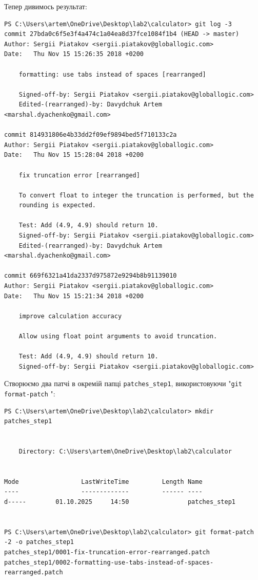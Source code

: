 \documentclass[a4paper,12pt]{article}
\begin{document}
    Тепер дивимось результат:
    \begin{verbatim}
PS C:\Users\artem\OneDrive\Desktop\lab2\calculator> git log -3
commit 27bda0c6f5e3f4a474c1a04ea8d37fce1084f1b4 (HEAD -> master)
Author: Sergii Piatakov <sergii.piatakov@globallogic.com>
Date:   Thu Nov 15 15:26:35 2018 +0200

    formatting: use tabs instead of spaces [rearranged]

    Signed-off-by: Sergii Piatakov <sergii.piatakov@globallogic.com>
    Edited-(rearranged)-by: Davydchuk Artem <marshal.dyachenko@gmail.com>

commit 814931806e4b33dd2f09ef9894bed5f710133c2a
Author: Sergii Piatakov <sergii.piatakov@globallogic.com>
Date:   Thu Nov 15 15:28:04 2018 +0200

    fix truncation error [rearranged]

    To convert float to integer the truncation is performed, but the
    rounding is expected.

    Test: Add (4.9, 4.9) should return 10.
    Signed-off-by: Sergii Piatakov <sergii.piatakov@globallogic.com>
    Edited-(rearranged)-by: Davydchuk Artem <marshal.dyachenko@gmail.com>

commit 669f6321a41da2337d975872e9294b8b91139010
Author: Sergii Piatakov <sergii.piatakov@globallogic.com>
Date:   Thu Nov 15 15:21:34 2018 +0200

    improve calculation accuracy

    Allow using float point arguments to avoid truncation.

    Test: Add (4.9, 4.9) should return 10.
    Signed-off-by: Sergii Piatakov <sergii.piatakov@globallogic.com>
    \end{verbatim}

    Створюємо два патчі в окремій папці \texttt{patches\_step1}, використовуючи "\texttt{git format-patch} ":
    \begin{verbatim}
PS C:\Users\artem\OneDrive\Desktop\lab2\calculator> mkdir patches_step1


    Directory: C:\Users\artem\OneDrive\Desktop\lab2\calculator


Mode                 LastWriteTime         Length Name
----                 -------------         ------ ----
d-----        01.10.2025     14:50                patches_step1


PS C:\Users\artem\OneDrive\Desktop\lab2\calculator> git format-patch -2 -o patches_step1
patches_step1/0001-fix-truncation-error-rearranged.patch
patches_step1/0002-formatting-use-tabs-instead-of-spaces-rearranged.patch
    \end{verbatim}
\end{document}
